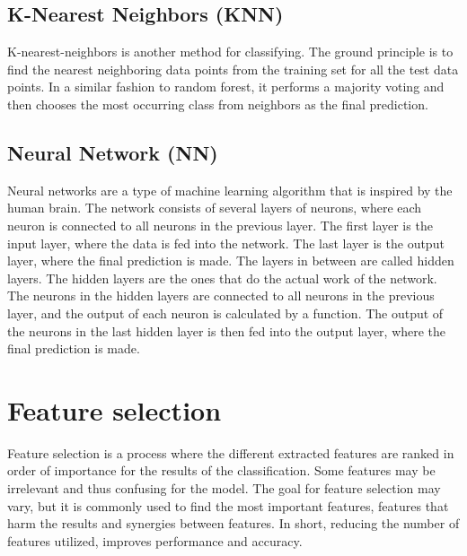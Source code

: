 \documentclass{kththesis}
\begin{document}

\subsection{K-Nearest Neighbors (KNN)}

K-nearest-neighbors is another method for classifying. The ground principle is to find the nearest neighboring data points from the training set for all the test data points. In a similar fashion to random forest, it performs a majority voting and then chooses the most occurring class from neighbors as the final prediction.


\subsection{Neural Network (NN)}

Neural networks are a type of machine learning algorithm that is inspired by the human brain. The network consists of several layers of neurons, where each neuron is connected to all neurons in the previous layer. The first layer is the input layer, where the data is fed into the network. The last layer is the output layer, where the final prediction is made. The layers in between are called hidden layers. The hidden layers are the ones that do the actual work of the network. The neurons in the hidden layers are connected to all neurons in the previous layer, and the output of each neuron is calculated by a function. The output of the neurons in the last hidden layer is then fed into the output layer, where the final prediction is made. \parencite{ibmWhatNeural}



\section{Feature selection}


Feature selection is a process where the different extracted features are ranked in order of importance for the results of the classification. Some features may be irrelevant and thus confusing for the model. The goal for feature selection may vary, but it is commonly used to find the most important features, features that harm the results and synergies between features. In short, reducing the number of features utilized, improves performance and accuracy. \parencite{chaganti2022thyroid}
\end{document}

